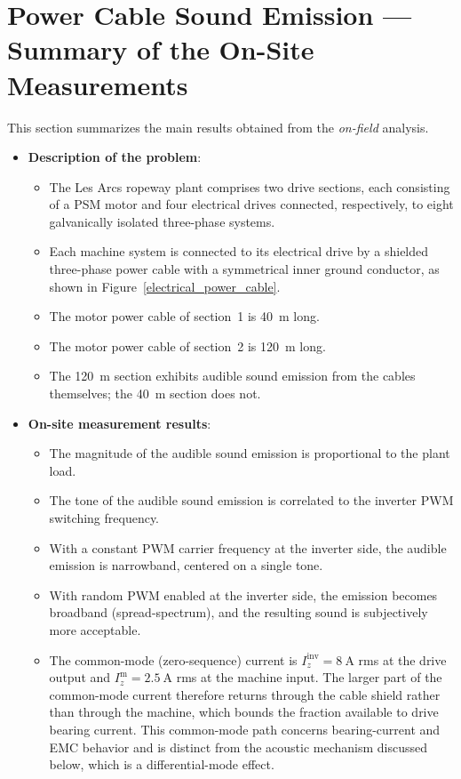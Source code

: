 \section{Power Cable Sound Emission --- Summary of the On-Site Measurements}
\label{sec:onsite_summary}

This section summarizes the main results obtained from the \textit{on-field}
analysis.

\begin{itemize}
	\item[--] \textbf{Description of the problem}:
	\begin{itemize}
		\item[--] The Les Arcs ropeway plant comprises two drive sections, each
		consisting of a PSM motor and four electrical drives connected,
		respectively, to eight galvanically isolated three-phase systems.
		\item[--] Each machine system is connected to its electrical drive by a
		shielded three-phase power cable with a symmetrical inner ground
		conductor, as shown in Figure~\ref{electrical_power_cable}.
		\item[--] The motor power cable of section~1 is \SI{40}{\meter} long.
		\item[--] The motor power cable of section~2 is \SI{120}{\meter} long.
		\item[--] The \SI{120}{\meter} section exhibits audible sound emission from
		the cables themselves; the \SI{40}{\meter} section does not.
	\end{itemize}

	\item[--] \textbf{On-site measurement results}:
	\begin{itemize}
		\item[--] The magnitude of the audible sound emission is proportional to
		the plant load.
		\item[--] The tone of the audible sound emission is correlated to the
		inverter PWM switching frequency.
		\item[--] With a constant PWM carrier frequency at the inverter side, the
		audible emission is narrowband, centered on a single tone.
		\item[--] With random PWM enabled at the inverter side, the emission becomes
		broadband (spread-spectrum), and the resulting sound is subjectively more
		acceptable.
		\item[--] The common-mode (zero-sequence) current is
		$I_z^{\mathrm{inv}}=\SI{8}{\ampere}$ rms at the drive output and
		$I_z^{\mathrm{m}}=\SI{2.5}{\ampere}$ rms at the machine input. The larger
		part of the common-mode current therefore returns through the cable shield
		rather than through the machine, which bounds the fraction available to
		drive bearing current. This common-mode path concerns bearing-current and
		EMC behavior and is distinct from the acoustic mechanism discussed below,
		which is a differential-mode effect.
	\end{itemize}


\end{itemize}
